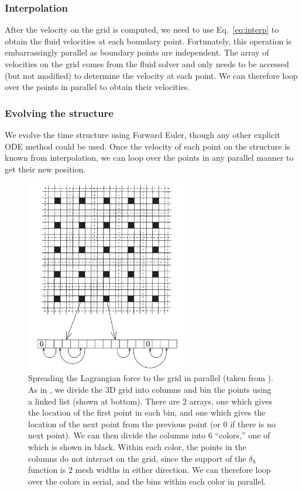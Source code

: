 \documentclass[]{article}
\begin{document}
\subsubsection{Interpolation}
After the velocity on the grid is computed, we need to use Eq.\ \eqref{eq:interp} to obtain the fluid velocities at each boundary point. Fortunately, this operation is embarrassingly parallel as boundary points are independent. The array of velocities on the grid comes from the fluid solver and only needs to be accessed (but not modified) to determine the velocity at each point. We can therefore loop over the points in parallel to obtain their velocities. 

\subsubsection{Evolving the structure}
We evolve the time structure using Forward Euler, though any other explicit ODE method could be used. Once the velocity of each point on the structure is known from interpolation, we can loop over the points in any parallel manner to get their new position. 

\begin{figure}
\centering     
\includegraphics[width=70mm]{PeskinMcQueen.png}
\caption{Spreading the Lagrangian force to the grid in parallel (taken from \cite{mcqueen}). As in \cite{mcqueen}, we divide the 3D grid into columns and bin the points using a linked list (shown at bottom). There are 2 arrays, one which gives the location of the first point in each bin, and one which gives the location of the next point from the previous point (or 0 if there is no next point). We can then divide the columns into 6 ``colors,'' one of which is shown in black. Within each color, the points in the columns do not interact on the grid, since the support of the $\delta_h$ function is 2 mesh widths in either direction. We can therefore loop over the colors in serial, and the bins within each color in parallel. }
\label{fig:parspread}
\end{figure}
\end{document}
